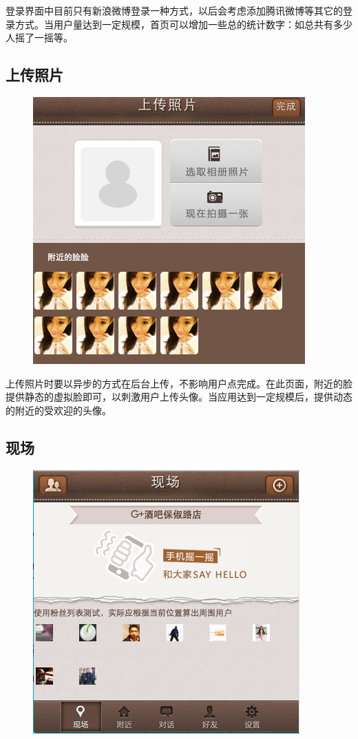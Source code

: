 \documentclass[cs4size]{ctexartutf8}
\begin{document}
登录界面中目前只有新浪微博登录一种方式，以后会考虑添加腾讯微博等其它的登录方式。当用户量达到一定规模，首页可以增加一些总的统计数字：如总共有多少人摇了一摇等。

\subsection{上传照片}

\begin{figure}[H]
\centering
\includegraphics[scale=0.5]{./2.png}
\end{figure}

上传照片时要以异步的方式在后台上传，不影响用户点完成。在此页面，附近的脸提供静态的虚拟脸即可，以刺激用户上传头像。当应用达到一定规模后，提供动态的附近的受欢迎的头像。

\subsection{现场}

\begin{figure}[H]
\centering
\includegraphics[scale=0.5]{./3.png}
\end{figure}
\end{document}
